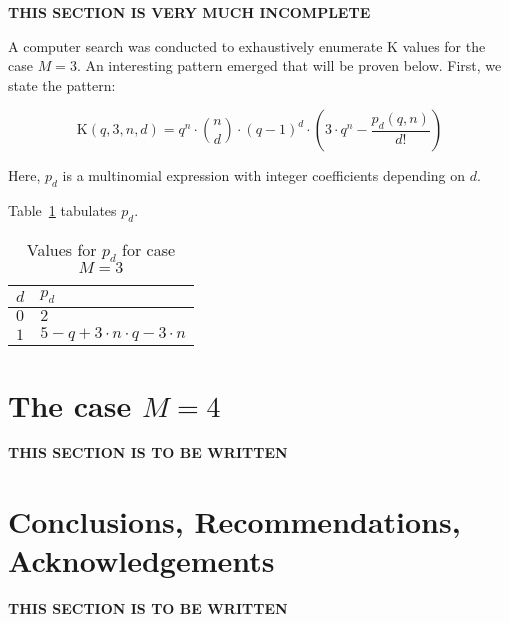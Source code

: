 \documentclass[a4paper]{article}
\newcommand{\codecount}{\mathrm{K}}
\begin{document}
\textbf{THIS SECTION IS VERY MUCH INCOMPLETE}

A computer search was conducted to exhaustively enumerate $\codecount$ values for
the case $M=3$. An interesting pattern emerged that will be proven below. First, we state the pattern:

\begin{equation}
\codecount(q, 3, n, d) = q^n \cdot \binom{n}{d} \cdot (q-1)^d \cdot (3 \cdot q^n - \frac{p_d(q, n)}{d!})
\end{equation}

Here, $p_d$ is a multinomial expression with integer coefficients depending on $d$.

Table~\ref{table:pd} tabulates $p_d$.

\begin{table}[h]
\begin{center}
\begin{tabular}{|l|l|}
\hline
$d$ & $p_d$ \\
\hline
$0$ & $2$ \\
$1$ & $5 - q + 3 \cdot n \cdot q - 3 \cdot n$ \\
\hline
\end{tabular}
\end{center}
\caption{Values for $p_d$ for case $M=3$}
\label{table:pd}
\end{table}

\section{The case $M=4$}
\label{sec:case-M4}

\textbf{THIS SECTION IS TO BE WRITTEN}

\section{Conclusions, Recommendations, Acknowledgements}
\label{sec:conclusions}

\textbf{THIS SECTION IS TO BE WRITTEN}
\end{document}
